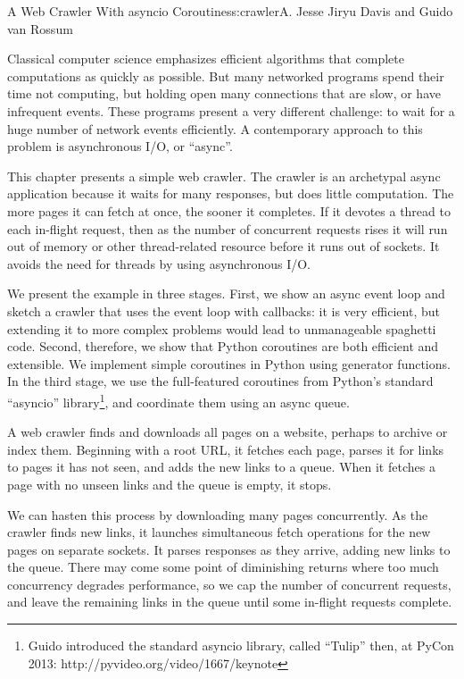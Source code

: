 \begin{aosachapter}{A Web Crawler With asyncio Coroutines}{s:crawler}{A. Jesse Jiryu Davis and Guido van Rossum}

Classical computer science emphasizes efficient algorithms that complete
computations as quickly as possible. But many networked programs spend
their time not computing, but holding open many connections that are
slow, or have infrequent events. These programs present a very different
challenge: to wait for a huge number of network events efficiently. A
contemporary approach to this problem is asynchronous I/O, or ``async''.

This chapter presents a simple web crawler. The crawler is an archetypal
async application because it waits for many responses, but does little
computation. The more pages it can fetch at once, the sooner it
completes. If it devotes a thread to each in-flight request, then as the
number of concurrent requests rises it will run out of memory or other
thread-related resource before it runs out of sockets. It avoids the
need for threads by using asynchronous I/O.

We present the example in three stages. First, we show an async event
loop and sketch a crawler that uses the event loop with callbacks: it is
very efficient, but extending it to more complex problems would lead to
unmanageable spaghetti code. Second, therefore, we show that Python
coroutines are both efficient and extensible. We implement simple
coroutines in Python using generator functions. In the third stage, we
use the full-featured coroutines from Python's standard ``asyncio''
library\footnote{Guido introduced the standard asyncio library, called
  ``Tulip'' then, at PyCon 2013: http://pyvideo.org/video/1667/keynote},
and coordinate them using an async queue.

\label{the-task}

A web crawler finds and downloads all pages on a website, perhaps to
archive or index them. Beginning with a root URL, it fetches each page,
parses it for links to pages it has not seen, and adds the new links to
a queue. When it fetches a page with no unseen links and the queue is
empty, it stops.

We can hasten this process by downloading many pages concurrently. As
the crawler finds new links, it launches simultaneous fetch operations
for the new pages on separate sockets. It parses responses as they
arrive, adding new links to the queue. There may come some point of
diminishing returns where too much concurrency degrades performance, so
we cap the number of concurrent requests, and leave the remaining links
in the queue until some in-flight requests complete.


\end{aosachapter}
